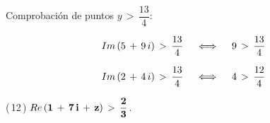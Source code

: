 \documentclass[a4paper,11pt,openany]{book}
\begin{document}
\textcolor{ao(english)}{} Comprobación de puntos $y\,>\,\dfrac{13}{4}$:

$$\mathnormal{Im}\,(5\,+\,9\,i)\,>\,\dfrac{13}{4} \quad\iff\quad 9\,>\,\dfrac{13}{4}$$

$$\mathnormal{Im}\,(2\,+\,4\,i)\,>\,\dfrac{13}{4} \quad\iff\quad 4\,>\,\dfrac{12}{4}$$

\textcolor{ao(english)}{(\,12\,)} $\bf{\mathnormal{Re}\,(1\,+\,7\,i\,+\,z)\,>\,\dfrac{2}{3}}$.
\end{document}
